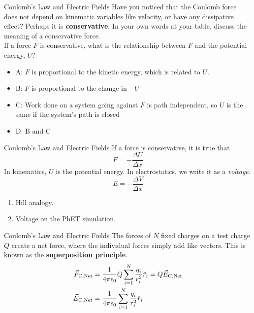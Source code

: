 \documentclass{beamer}
\begin{document}
\begin{frame}{Coulomb’s Law and Electric Fields}
Have you noticed that the Coulomb force does not depend on kinematic variables like velocity, or have any dissipative effect?  Perhaps it is \alert{\textbf{conservative}}.  In your own words at your table, discuss the meaning of a conservative force. \\ \vspace{0.5cm}
\small
If a force $F$ is conservative, what is the relationship between $F$ and the potential energy, $U$?
\begin{itemize}
\item A: $F$ is proportional to the kinetic energy, which is related to $U$.
\item B: $F$ is proportional to the change in $-U$
\item C: Work done on a system going against $F$ is path independent, so $U$ is the same if the system's path is closed
\item D: B and C
\end{itemize}
\end{frame}

\begin{frame}{Coulomb’s Law and Electric Fields}
If a force is conservative, it is true that
\begin{equation}
F = -\frac{\Delta U}{\Delta x}
\end{equation}
In kinematics, $U$ is the potential energy.  In electrostatics, we write it as a \textit{voltage.}
\begin{equation}
E = -\frac{\Delta V}{\Delta x}
\end{equation}
\begin{enumerate}
\item Hill analogy.
\item Voltage on the PhET simulation.
\end{enumerate}
\end{frame}

\begin{frame}{Coulomb’s Law and Electric Fields}
The forces of $N$ fixed charges on a test charge $Q$ create a net force, where the individual forces simply add like vectors.  This is known as the \textbf{superposition principle}.
\begin{align}
\vec{F}_{\rm C,Net} &= \frac{1}{4\pi\epsilon_{\rm 0}} Q \sum_{i = 1}^N \frac{q_i}{r_i^2}\hat{r}_i = Q \vec{E}_{\rm C,Net} \\
\vec{E}_{\rm C,Net} &= \frac{1}{4\pi\epsilon_{\rm 0}} \sum_{i = 1}^N \frac{q_i}{r_i^2}\hat{r}_i
\end{align}
\end{frame}
\end{document}
